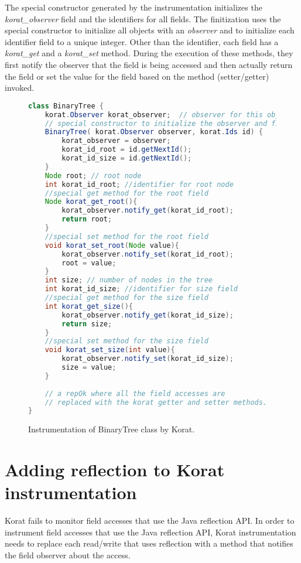 \para The special constructor generated by the instrumentation
initializes the \emph{korat\_observer} field and the identifiers for all
fields. The finitization uses the special constructor to initialize
all objects with an \emph{observer} and to initialize each identifier field
to a unique integer. Other than the identifier, each field has a
\emph{korat\_get} and a \emph{korat\_set} method. During the execution of
these methods, they first notify the observer that the field is being
accessed and then actually return the field or set the value for the
field based on the method (setter/getter) invoked.


\begin{figure}
\centering
\begin{lstlisting}[language=Java]
class BinaryTree {
    korat.Observer korat_observer;  // observer for this object
    // special constructor to initialize the observer and field ids
    BinaryTree( korat.Observer observer, korat.Ids id) {
        korat_observer = observer;
        korat_id_root = id.getNextId();
        korat_id_size = id.getNextId();
    }
    Node root; // root node
    int korat_id_root; //identifier for root node
    //special get method for the root field
    Node korat_get_root(){
        korat_observer.notify_get(korat_id_root);
        return root;
    }
    //special set method for the root field
    void korat_set_root(Node value){
        korat_observer.notify_set(korat_id_root);
        root = value;
    }
    int size; // number of nodes in the tree
    int korat_id_size; //identifier for size field
    //special get method for the size field
    int korat_get_size(){ 
        korat_observer.notify_get(korat_id_size);
        return size;
    }
    //special set method for the size field
    void korat_set_size(int value){ 
        korat_observer.notify_set(korat_id_size);
        size = value;
    }
   
    // a repOk where all the field accesses are 
    // replaced with the korat getter and setter methods.
}
\end{lstlisting}
\caption{Instrumentation of BinaryTree class by Korat.}
\label{fig:btTreeInstrumentationKorat}
\end{figure}


\section{Adding reflection to Korat instrumentation}
\label{sec:adding-reflection-to-instrumentation}
Korat fails to monitor field accesses that use the Java reflection
API. In order to instrument field accesses that use the Java
reflection API, Korat instrumentation needs to replace each read/write
that uses reflection with a method that notifies the field observer
about the access. 

